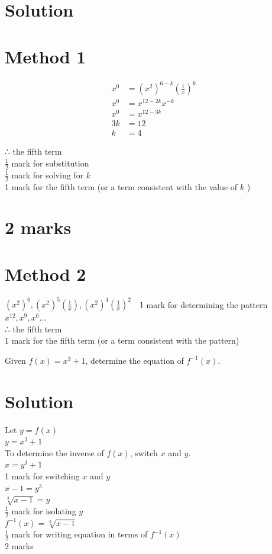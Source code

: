 \documentclass[10pt]{article}
\begin{document}
\section*{Solution}
\section*{Method 1}
$$
\begin{aligned}
x^{0} & =\left(x^{2}\right)^{6-k}\left(\frac{1}{x}\right)^{k} \\
x^{0} & =x^{12-2 k} x^{-k} \\
x^{0} & =x^{12-3 k} \\
3 k & =12 \\
k & =4
\end{aligned}
$$

∴ the fifth term\\
$\frac{1}{2}$ mark for substitution\\
$\frac{1}{2}$ mark for solving for $k$\\
1 mark for the fifth term (or a term consistent with the value of $k$ )

\section*{2 marks}
\section*{Method 2}
$\left(x^{2}\right)^{6},\left(x^{2}\right)^{5}\left(\frac{1}{x}\right),\left(x^{2}\right)^{4}\left(\frac{1}{x}\right)^{2} \quad 1$ mark for determining the pattern\\
$x^{12}, x^{9}, x^{6} \ldots$\\
∴ the fifth term\\
1 mark for the fifth term (or a term consistent with the pattern)

Given $f(x)=x^{3}+1$, determine the equation of $f^{-1}(x)$.

\section*{Solution}
Let $y=f(x)$\\
$y=x^{3}+1$\\
To determine the inverse of $f(x)$, switch $x$ and $y$.\\
$x=y^{3}+1$\\
1 mark for switching $x$ and $y$\\
$x-1=y^{3}$\\
$\sqrt[3]{x-1}=y$\\
$\frac{1}{2}$ mark for isolating $y$\\
$f^{-1}(x)=\sqrt[3]{x-1}$\\
$\frac{1}{2}$ mark for writing equation in terms of $f^{-1}(x)$\\
2 marks
\end{document}
